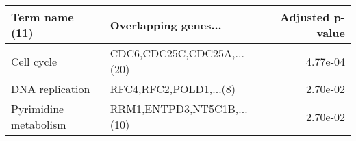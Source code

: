 \begin{tabular}{llr}
\toprule
       Term name (11) &       Overlapping genes... &  Adjusted p-value \\
\midrule
           Cell cycle & CDC6,CDC25C,CDC25A,...(20) &          4.77e-04 \\
      DNA replication &     RFC4,RFC2,POLD1,...(8) &          2.70e-02 \\
Pyrimidine metabolism & RRM1,ENTPD3,NT5C1B,...(10) &          2.70e-02 \\
\bottomrule
\end{tabular}
